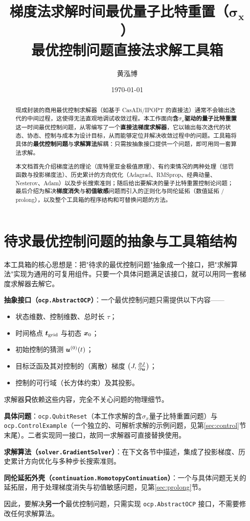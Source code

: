 \documentclass[UTF8]{article}
\title{梯度法求解时间最优量子比特重置（$\boldsymbol{\sigma_x}$）\\\large 最优控制问题直接法求解工具箱}
\author{黄泓博}
\date{\today}
\numberwithin{equation}{section}
\begin{document}
    \maketitle
    \begin{abstract}
        现成封装的商用最优控制求解器（如基于 CasADi/IPOPT 的直接法）通常不会输出迭代的中间过程，这使得无法直观地调试收敛过程。本工作面向\textbf{含$\sigma_x$驱动的量子比特重置}这一时间最优控制问题，从零编写了一个\textbf{直接法梯度求解器}，它以输出每次迭代的状态、协态、控制与成本为设计目标，从而能够定位并解决收敛过程中的问题。工具箱将具体的\textbf{最优控制问题}与\textbf{求解算法}解耦：只需按抽象接口提供一个问题，即可用同一套算法求解。
        \par
        本文档首先介绍梯度法的理论（庞特里亚金极值原理）、有约束情况的两种处理（惩罚函数与投影梯度法）、历史累计的方向优化（Adagrad、RMSprop、经典动量、Nesterov、Adam）以及步长搜索准则；随后给出要解决的量子比特重置控制论问题；最后介绍为解决\textbf{梯度消失}与\textbf{初值敏感}问题而引入的正则化与同伦延拓（数值延拓 / prolong），以及整个工具箱的程序结构和可替换问题的方法。
    \end{abstract}

    \section{待求最优控制问题的抽象与工具箱结构}
        本工具箱的核心思想是：把"待求的最优控制问题"抽象成一个接口，把"求解算法"实现为通用的可复用组件。只要一个具体问题满足该接口，就可以用同一套梯度求解器去解它。
        \par
        \textbf{抽象接口（\texttt{ocp.AbstractOCP}）}：一个最优控制问题只需提供以下内容——
        \begin{itemize}
            \item 状态维数、控制维数、总时长 $\tau$；
            \item 时间格点 $\vb*{t}_\mathrm{grid}$ 与初态 $\vb*{x}_0$；
            \item 初始控制的猜测 $\vb*{u}^{\pqty{0}}\pqty{t}$；
            \item 目标泛函及其对控制的（离散）梯度 $\pqty{J,\pdv{J}{\vb*{u}}}$；
            \item 控制的可行域（长方体约束）及其投影。
        \end{itemize}
        求解器\textbf{只}依赖这些内容，完全不关心问题的物理细节。
        \par
        \textbf{具体问题}：\texttt{ocp.QubitReset}（本工作求解的含$\sigma_x$量子比特重置问题）与 \texttt{ocp.ControlExample}（一个独立的、可解析求解的示例问题，见第\ref{sec:control}节末尾）。二者实现同一接口，故同一求解器可直接替换使用。
        \par
        \textbf{求解算法（\texttt{solver.GradientSolver}）}：在下文各节中描述，集成了投影梯度、历史累计方向优化与多种步长搜索准则。
        \par
        \textbf{同伦延拓外壳（\texttt{continuation.HomotopyContinuation}）}：一个与具体问题无关的延拓层，用于处理梯度消失与初值敏感问题，见第\ref{sec:prolong}节。
        \par
        因此，要解决\textbf{另一个}最优控制问题，只需实现 \texttt{ocp.AbstractOCP} 接口，不需要修改任何求解算法。
\end{document}
